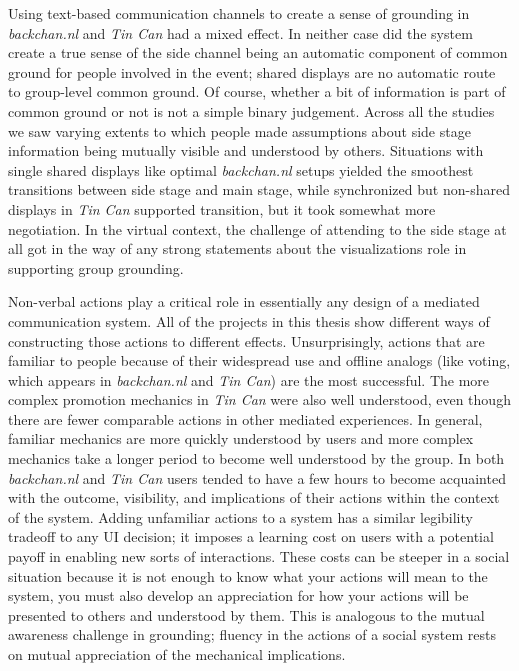 Using text-based communication channels to create a sense of grounding in \emph{backchan.nl} and \emph{Tin Can} had a mixed effect. In neither case did the system create a true sense of the side channel being an automatic component of common ground for people involved in the event; shared displays are no automatic route to group-level common ground. Of course, whether a bit of information is part of common ground or not is not a simple binary judgement. Across all the studies we saw varying extents to which people made assumptions about side stage information being mutually visible and understood by others. Situations with single shared displays like optimal \emph{backchan.nl} setups yielded the smoothest transitions between side stage and main stage, while synchronized but non-shared displays in \emph{Tin Can} supported transition, but it took somewhat more negotiation. In the virtual context, the challenge of attending to the side stage at all got in the way of any strong statements about the visualizations role in supporting group grounding.

Non-verbal actions play a critical role in essentially any design of a mediated communication system. All of the projects in this thesis show different ways of constructing those actions to different effects. Unsurprisingly, actions that are familiar to people because of their widespread use and offline analogs (like voting, which appears in \emph{backchan.nl} and \emph{Tin Can}) are the most successful. The more complex promotion mechanics in \emph{Tin Can} were also well understood, even though there are fewer comparable actions in other mediated experiences. In general, familiar mechanics are more quickly understood by users and more complex mechanics take a longer period to become well understood by the group. In both \emph{backchan.nl} and \emph{Tin Can} users tended to have a few hours to become acquainted with the outcome, visibility, and implications of their actions within the context of the system. Adding unfamiliar actions to a system has a similar legibility tradeoff to any UI decision; it imposes a learning cost on users with a potential payoff in enabling new sorts of interactions. These costs can be steeper in a social situation because it is not enough to know what your actions will mean to the system, you must also develop an appreciation for how your actions will be presented to others and understood by them. This is analogous to the mutual awareness challenge in grounding; fluency in the actions of a social system rests on mutual appreciation of the mechanical implications.

